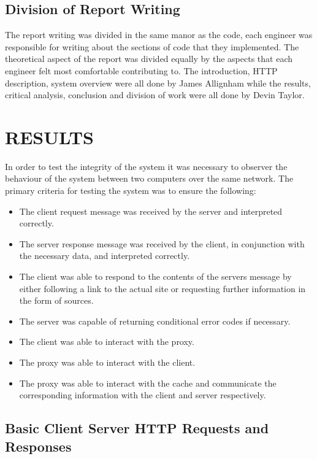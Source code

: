 \documentclass[10pt,twocolumn]{witseiepaper}
\begin{document}
	\subsection{Division of Report Writing}
	
		The report writing was divided in the same manor as the code, each engineer was responsible for writing about the sections of code that they implemented. The theoretical aspect of the report was divided equally by the aspects that each engineer felt most comfortable contributing to. The introduction, HTTP description, system overview were all done by James Allignham while the results, critical analysis, conclusion and division of work were all done by Devin Taylor.
	

\section{RESULTS}

	In order to test the integrity of the system it was necessary to observer the behaviour of the system between two computers over the same network. The primary criteria for testing the system was to ensure the following:

	\begin{itemize}
		\item The client request message was received by the server and interpreted correctly.
		\item The server response message was received by the client, in conjunction with the necessary data, and interpreted correctly.
		\item The client was able to respond to the contents of the servers message by either following a link to the actual site or requesting further information in the form of sources.
		\item The server was capable of returning conditional error codes if necessary.
		\item The client was able to interact with the proxy.
		\item The proxy was able to interact with the client.
		\item The proxy was able to interact with the cache and communicate the corresponding information with the client and server respectively.
	\end{itemize}

	\subsection{Basic Client Server HTTP Requests and Responses} %
	\label{sub:basic_client_server}
		
\end{document}

